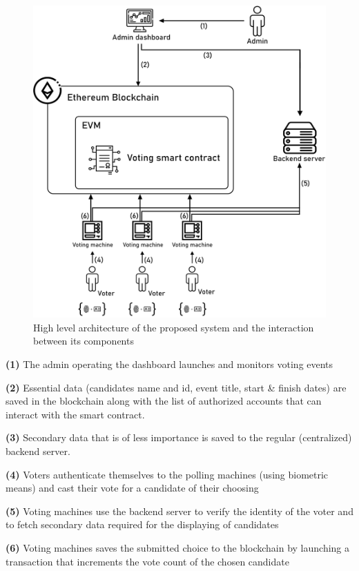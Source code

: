 \begin{figure}[H]
	\centering
		\includegraphics[width=12cm]{images/chapter3/architecture.png}
		\caption{{\footnotesize High level architecture of the proposed system and the interaction between its components}}
\end{figure}

\begin{list}{}{}
\item \textbf{(1)} The admin operating the dashboard launches and monitors voting events
\item \textbf{(2)} Essential data (candidates name and id, event title, start \& finish dates) are saved in the blockchain along with the list of authorized accounts that can interact with the smart contract.
\item \textbf{(3)} Secondary data that is of less importance is saved to the regular (centralized) backend server.
\item \textbf{(4)} Voters authenticate themselves to the polling machines (using biometric means) and cast their vote for a candidate of their choosing
\item \textbf{(5)} Voting machines use the backend server to verify the identity of the voter and to fetch secondary data required for the displaying of candidates
\item \textbf{(6)} Voting machines saves the submitted choice to the blockchain by launching a transaction that increments the vote count of the chosen candidate
\end{list}

